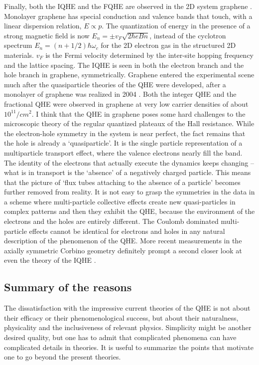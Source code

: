\documentclass[aps,preprint,12pt,tightenlines]{revtex4}%
\begin{document}
Finally, both the IQHE and the FQHE are observed in the 2D system graphene
\cite{Graphene-rev}. Monolayer graphene has special conduction and valence
bands that touch, with a linear dispersion relation, $E\propto p$. The
quantization of energy in the presence of a strong magnetic field is now
$E_{n}=\pm v_{F}\sqrt{2\hbar eBn}$, instead of the cyclotron spectrum
$E_{n}=\left(  n+1/2\right)  \hbar\omega_{c}$ for the 2D electron gas in the
structured 2D materials. $v_{F}$ is the Fermi velocity determined by the
inter-site hopping frequency and the lattice spacing. The IQHE is seen in both
the electron branch and the hole branch in graphene, symmetrically. Graphene
entered the experimental scene much after the quasiparticle theories of the
QHE were developed, after a monolayer of graphene was realized in 2004
\cite{Novoselov-QHE}. Both the integer QHE and the fractional QHE were
observed in graphene at very low carrier densities of about $10^{11}/cm^{2}$.
I think that the QHE in graphene poses some hard challenges to the
microscopic theory of the regular quantized plateaux of the Hall resistance.
While the electron-hole symmetry in the system is near perfect, the fact
remains that the hole is already a `quasiparticle'. It is the single particle
representation of a multiparticle transport effect, where the valence
electrons nearly fill the band. The identity of the electrons that actually
execute the dynamics keeps changing -- what is in transport is the `absence'
of a negatively charged particle. This means that the picture of `flux tubes
attaching to the absence of a particle' becomes further removed from reality.
It is not easy to grasp the symmetries in the data in a scheme where
multi-particle collective effects create new quasi-particles in complex
patterns and then they exhibit the QHE, because the environment of the
electrons and the holes are entirely different. The Coulomb dominated
multi-particle effects cannot be identical for electrons and holes in any
natural description of the phenomenon of the QHE. More recent measurements in
the axially symmetric Corbino geometry \cite{Dogopolov,Zeng} definitely prompt
a second closer look at even the theory of the IQHE
\cite{Klitzing-Physica,Klitzing-Weis}.

\subsection*{Summary of the reasons}

The dissatisfaction with the impressive current theories of the QHE is not
about their efficacy or their phenomenological success, but about their
naturalness, physicality and the inclusiveness of relevant physics. Simplicity
might be another desired quality, but one has to admit that complicated
phenomena can have complicated details in theories. It is useful to summarize
the points that motivate one to go beyond the present theories.
\end{document}

